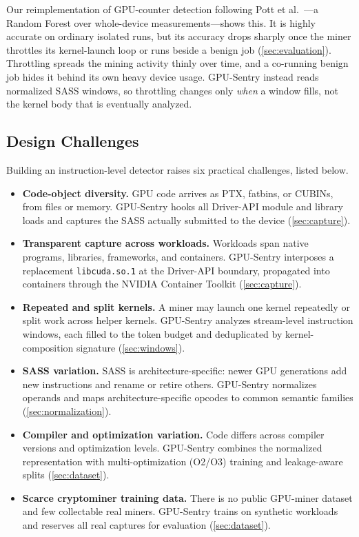 Our reimplementation of GPU-counter detection following Pott et al.~\cite{pott2023gpucryptojacking}---a Random Forest over whole-device measurements---shows this. It is highly accurate on ordinary isolated runs, but its accuracy drops sharply once the miner throttles its kernel-launch loop or runs beside a benign job (\cref{sec:evaluation}). Throttling spreads the mining activity thinly over time, and a co-running benign job hides it behind its own heavy device usage. GPU-Sentry instead reads normalized SASS windows, so throttling changes only \emph{when} a window fills, not the kernel body that is eventually analyzed.

\subsection{Design Challenges}

Building an instruction-level detector raises six practical challenges, listed below.

\begin{itemize}
    \item \textbf{Code-object diversity.} GPU code arrives as PTX, fatbins, or CUBINs, from files or memory. GPU-Sentry hooks all Driver-API module and library loads and captures the SASS actually submitted to the device (\cref{sec:capture}).
    \item \textbf{Transparent capture across workloads.} Workloads span native programs, libraries, frameworks, and containers. GPU-Sentry interposes a replacement \texttt{libcuda.so.1} at the Driver-API boundary, propagated into containers through the NVIDIA Container Toolkit (\cref{sec:capture}).
    \item \textbf{Repeated and split kernels.} A miner may launch one kernel repeatedly or split work across helper kernels. GPU-Sentry analyzes stream-level instruction windows, each filled to the token budget and deduplicated by kernel-composition signature (\cref{sec:windows}).
    \item \textbf{SASS variation.} SASS is architecture-specific: newer GPU generations add new instructions and rename or retire others. GPU-Sentry normalizes operands and maps architecture-specific opcodes to common semantic families (\cref{sec:normalization}).
    \item \textbf{Compiler and optimization variation.} Code differs across compiler versions and optimization levels. GPU-Sentry combines the normalized representation with multi-optimization (O2/O3) training and leakage-aware splits (\cref{sec:dataset}).
    \item \textbf{Scarce cryptominer training data.} There is no public GPU-miner dataset and few collectable real miners. GPU-Sentry trains on synthetic workloads and reserves all real captures for evaluation (\cref{sec:dataset}).
\end{itemize}

